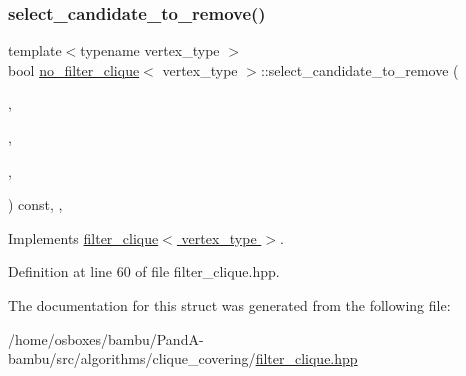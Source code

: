 \subsubsection{\texorpdfstring{select\+\_\+candidate\+\_\+to\+\_\+remove()}{select\_candidate\_to\_remove()}}
{\footnotesize\ttfamily template$<$typename vertex\+\_\+type $>$ \\
bool \hyperlink{structno__filter__clique}{no\+\_\+filter\+\_\+clique}$<$ vertex\+\_\+type $>$\+::select\+\_\+candidate\+\_\+to\+\_\+remove (\begin{DoxyParamCaption}\item[{const \hyperlink{classCustomOrderedSet}{Custom\+Ordered\+Set}$<$ \hyperlink{clique__covering__graph_8hpp_a9cb45047ea8c5ed95a8cfa90494345aa}{C\+\_\+vertex} $>$ \&}]{,  }\item[{\hyperlink{clique__covering__graph_8hpp_a9cb45047ea8c5ed95a8cfa90494345aa}{C\+\_\+vertex} \&}]{,  }\item[{const std\+::map$<$ \hyperlink{clique__covering__graph_8hpp_a9cb45047ea8c5ed95a8cfa90494345aa}{C\+\_\+vertex}, vertex\+\_\+type $>$ \&}]{,  }\item[{const \hyperlink{clique__covering__graph_8hpp_aa88e9419fe776ef37020cacd507cc4ad}{cc\+\_\+compatibility\+\_\+graph} \&}]{ }\end{DoxyParamCaption}) const\hspace{0.3cm}{\ttfamily [inline]}, {\ttfamily [override]}, {\ttfamily [virtual]}}



Implements \hyperlink{structfilter__clique_aaeef789b709e45c93269c6b137ea00ff}{filter\+\_\+clique$<$ vertex\+\_\+type $>$}.



Definition at line 60 of file filter\+\_\+clique.\+hpp.



The documentation for this struct was generated from the following file\+:\begin{DoxyCompactItemize}
\item 
/home/osboxes/bambu/\+Pand\+A-\/bambu/src/algorithms/clique\+\_\+covering/\hyperlink{filter__clique_8hpp}{filter\+\_\+clique.\+hpp}\end{DoxyCompactItemize}
